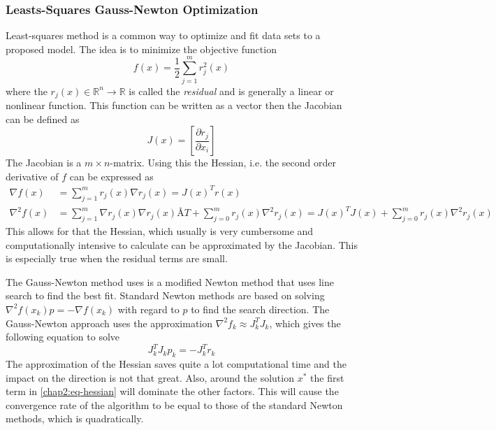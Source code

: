 \subsubsection{Leasts-Squares Gauss-Newton Optimization}
\label{chap2:subsec-gauss-newton}
Least-squares method is a common way to optimize and fit data sets to a proposed model.
The idea is to minimize the objective function 
\begin{equation}
    f(x) = \frac{1}{2} \sum_{j = 1}^m r^2_j (x)
\end{equation}
where the $r_j(x) \in \mathbb{R}^n \rightarrow \mathbb{R}$ is called the \emph{residual} and
is generally a linear or nonlinear function. This function can be written as a vector then
the Jacobian can be defined as
\begin{equation}
    J (x) = \left[ \frac{\partial r_j}{\partial x_i} \right]
\end{equation}
The Jacobian is a $m \times n$-matrix. Using this the Hessian, i.e. the second order
derivative of $f$ can be expressed as
\begin{align}
    \nabla f(x) &= \sum_{j = 1}^m r_j(x) \nabla r_j(x) = J(x)^T r(x) \\
    \nabla^2 f(x) &= \sum_{j=1}^m \nabla r_j (x) \nabla r_j(x)Å T + \sum_{j=0}^m r_j(x)
    \nabla^2 r_j(x) = J(x)^T J(x) + \sum_{j= 0}^m r_j(x) \nabla^2 r_j(x)
    \label{chap2:eq-hessian}
\end{align}
This allows for that the Hessian, which usually is very cumbersome and computationally
intensive to calculate can be approximated by the Jacobian. This is especially true when
the residual terms are small.

The Gauss-Newton method uses is a modified Newton method that uses line search to find the
best fit. Standard Newton methods are based on solving $\nabla^2 f(x_k) p = -\nabla
f(x_k)$ with regard to $p$ to find the search direction. The Gauss-Newton approach uses
the approximation $\nabla^2 f_k \approx  J_k^T J_k$, which gives the following equation to
solve
\begin{equation}
    J_k^T J_k p_k = - J_k^T r_k
\end{equation}
The approximation of the Hessian saves quite a lot computational time and the impact on
the direction is not that great. Also, around the solution $x^*$ the first term in
\eqref{chap2:eq-hessian} will dominate the other factors. This will cause the convergence
rate of the algorithm to be equal to those of the standard Newton methods, which is
quadratically.\cite{optreg} 

